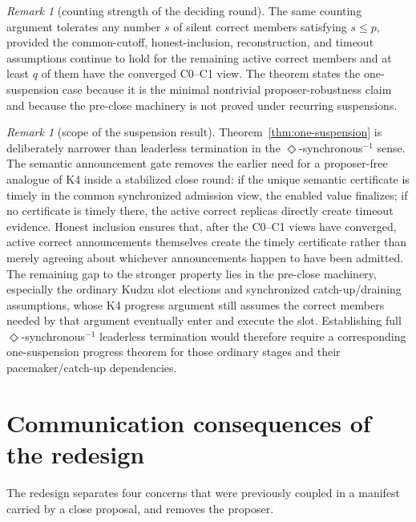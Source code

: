 \documentclass[11pt]{article}
\theoremstyle{definition}
\theoremstyle{remark}
\newtheorem{remark}[theorem]{Remark}
\begin{document}
\begin{remark}[counting strength of the deciding round]
The same counting argument tolerates any number $s$ of silent correct members satisfying $s\le p$, provided the common-cutoff, honest-inclusion, reconstruction, and timeout assumptions continue to hold for the remaining active correct members and at least $q$ of them have the converged C0--C1 view. The theorem states the one-suspension case because it is the minimal nontrivial proposer-robustness claim and because the pre-close machinery is not proved under recurring suspensions.
\end{remark}

\begin{remark}[scope of the suspension result]
Theorem~\ref{thm:one-suspension} is deliberately narrower than leaderless termination in the $\Diamond$-synchronous$^{-1}$ sense. The semantic announcement gate removes the earlier need for a proposer-free analogue of K4 inside a stabilized close round: if the unique semantic certificate is timely in the common synchronized admission view, the enabled value finalizes; if no certificate is timely there, the active correct replicas directly create timeout evidence. Honest inclusion ensures that, after the C0--C1 views have converged, active correct announcements themselves create the timely certificate rather than merely agreeing about whichever announcements happen to have been admitted. The remaining gap to the stronger property lies in the pre-close machinery, especially the ordinary Kudzu slot elections and synchronized catch-up/draining assumptions, whose K4 progress argument still assumes the correct members needed by that argument eventually enter and execute the slot. Establishing full $\Diamond$-synchronous$^{-1}$ leaderless termination would therefore require a corresponding one-suspension progress theorem for those ordinary stages and their pacemaker/catch-up dependencies.
\end{remark}

\section{Communication consequences of the redesign}

The redesign separates four concerns that were previously coupled in a manifest carried by a close proposal, and removes the proposer.
\end{document}
